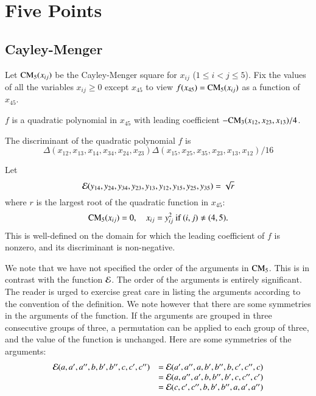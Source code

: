 \section{Five Points}

\subsection{Cayley-Menger}

Let ${\operatorname{CM}}_5(x_{ij})$ be the Cayley-Menger
square for $x_{ij}$  ($1\le i < j\le 5$).  Fix the values of all the variables $x_{ij}\ge 0$ except
$x_{45}$ to view $f(x_{45})={\operatorname{CM}}_5(x_{ij})$ as a function of $x_{45}$.

\begin{lemma}
$f$  is a quadratic
polynomial in $x_{45}$ with leading coefficient 
$-{\operatorname{CM}}_3(x_{12},x_{23},x_{13})/4$. 
\end{lemma}



\begin{lemma}
The discriminant of the quadratic polynomial $f$ is
	$$
	\Delta(x_{12}, x_{13}, x_{14}, x_{34}, x_{24}, x_{23}) 
	\Delta(x_{15}, x_{25}, x_{35}, x_{23}, 
          x_{13}, x_{12}) /16
	$$
\end{lemma}

\newpage
\begin{definition}[$\CalE$] 
Let 
$${\mathcal E}(y_{14},y_{24},y_{34},y_{23},y_{13},y_{12},y_{15},y_{25},y_{35})=\sqrt{r}$$
where $r$ is the largest root of the quadratic function in $x_{45}$:
	$$
	{\operatorname{CM}}_5(x_{ij}) = 0,\quad x_{ij} = y_{ij}^2 \hbox{ if } (i,j)\ne (4,5).
	$$
This is well-defined on the domain for which the leading coefficient of $f$ is nonzero, and its
discriminant is non-negative.  
\end{definition}

We note that we have not specified the order of the arguments in ${\operatorname{CM}}_5$.   This is in
contrast with the function $\CalE$.  The order of the arguments is entirely significant.
The reader is urged to exercise great care in listing the arguments according to the
convention of the definition.  We note however that there are some symmetries in the
arguments of the function.  
If the arguments are grouped in three consecutive groups of three, a permutation
can be applied to each group of three, and the value of the function is unchanged.  Here
are some symmetries of the arguments:
	$$
	\begin{array}{lll}
	{\mathcal E}(a,a',a'',b,b',b'',c,c',c'') &= {\mathcal E}(a',a'',a,b',b'',b,c',c'',c)\\
			&={\mathcal E}(a,a'',a',b,b'',b',c,c'',c')\\
			&= {\mathcal E}(c,c',c'',b,b',b'',a,a',a'')\\
	\end{array}
	$$

